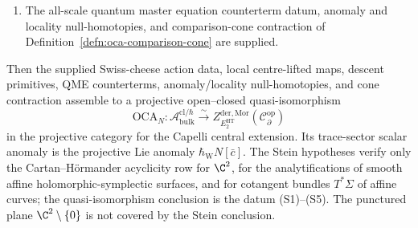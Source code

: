 \begin{thm}
\begin{enumerate}[label=\textup{(S\arabic*)}]
  higher cochains give a homotopy-coherent null-homotopy of
  \[
    \operatorname{Ob}_{\mathrm{desc}}\in
    H^2\!\left(
    \operatorname{Tot}\check C^\bullet_{\mathrm{Weiss}}
    (\mathfrak U;\mathcal E^\bullet_{\mathrm{desc}})
    \right)
  \]
  and of its higher obstruction tower
  (Definition~\ref{app:defn:descent-obstruction-complex}).
\item The all-scale quantum master equation counterterm datum, anomaly
  and locality null-homotopies, and comparison-cone contraction of
  Definition~\ref{defn:oca-comparison-cone} are supplied.
\end{enumerate}
Then the supplied Swiss-cheese action data, local centre-lifted maps,
descent primitives, QME counterterms, anomaly/locality null-homotopies,
and cone contraction assemble to a projective open--closed
quasi-isomorphism
\[
  \mathrm{OCA}_N\colon
  \mathcal A^{\mathrm{cl}/\hbar}_{\mathrm{bulk}}
  \xrightarrow{\ \sim\ }
  Z^{\mathrm{der},\mathrm{Mor}}_{E_2^{\mathrm{HT}}}
    (\mathcal C^{\mathrm{op}}_\partial)
\]
in the projective category for the Capelli central extension.  Its
trace-sector scalar anomaly is the projective Lie anomaly
\(\hbar_{\mathrm{W}} N[\bar c]\).  The Stein hypotheses verify only the
Cartan--H\"ormander acyclicity row for \(\C^2\), for the
analytifications of smooth affine holomorphic-symplectic surfaces, and
for cotangent bundles \(T^*\Sigma\) of affine curves; the
quasi-isomorphism conclusion is the datum \textup{(S1)--(S5)}.  The
punctured plane
\(\C^2\setminus\{0\}\) is not covered by the Stein conclusion.
\end{thm}

